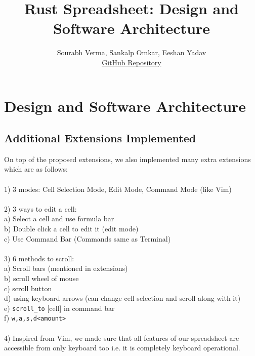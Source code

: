 \documentclass{article}
\title{Rust Spreadsheet: Design and Software Architecture}
\author{Sourabh Verma, Sankalp Omkar, Eeshan Yadav \\ \href{https://github.com/golden-api/rust_spreadsheet.git}{GitHub Repository}}
\begin{document}
\maketitle

\section{Design and Software Architecture}

\subsection{Additional Extensions Implemented}
\label{sec:additional_extensions}
On top of the proposed extensions, we also implemented many extra extensions which are as follows:
\\ \\
1) 3 modes: Cell Selection Mode, Edit Mode, Command Mode (like Vim)
\\ \\
2) 3 ways to edit a cell:\\
\hspace*{5mm}a) Select a cell and use formula bar\\
\hspace*{5mm}b) Double click a cell to edit it (edit mode)\\
\hspace*{5mm}c) Use Command Bar (Commands same as Terminal)
\\ \\
3) 6 methods to scroll:\\ 
\hspace*{5mm}a) Scroll bars (mentioned in extensions)\\
\hspace*{5mm}b) scroll wheel of mouse\\
\hspace*{5mm}c) scroll button\\
\hspace*{5mm}d) using keyboard arrows (can change cell selection and scroll along with it)\\
\hspace*{5mm}e) \texttt{scroll\_to} [cell] in command bar\\
\hspace*{5mm}f) \texttt{w,a,s,d<amount>}
\\ \\
4) Inspired from Vim, we made sure that all features of our spreadsheet are accessible from only keyboard too i.e. it is completely keyboard operational.
\end{document}
